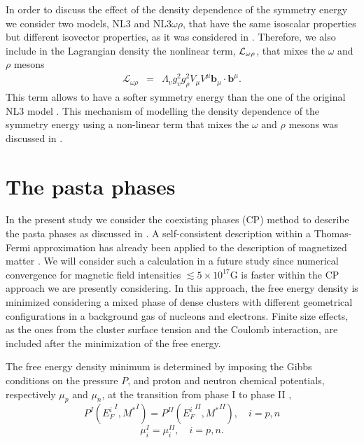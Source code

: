 \documentclass[epj]{svjour}
\begin{document}
In order to discuss the effect of the density dependence of the
symmetry energy we consider two models, NL3 and NL3$\omega\rho$, that have the
same isoscalar properties but different isovector properties, as it was
considered in \cite{Fang16}.
Therefore, we also include in the Lagrangian density the nonlinear term, ${\cal L}_{\omega\rho}$, that mixes the $\omega$ and $\rho$ mesons
\begin{eqnarray}
\mathcal{L}_{\omega \rho } &=& \Lambda_v g_v^2 g_\rho^2 V_{\mu }V^{\mu }
\mathbf{b}_{\mu }\cdot \mathbf{b}^{\mu }.
\end{eqnarray}
This term allows to have a softer symmetry energy than the one of the
original NL3 model  \cite{nl3}. This mechanism of modelling the density dependence of the symmetry energy using a non-linear term that mixes the $\omega$ and $\rho$ mesons was discussed in \cite{Horowitz2001PRL}.

\section{The pasta phases\label{pasta}}


    In the present study we consider the coexisting phases (CP) method to
      describe  the pasta phases as discussed in \cite{Maruyama2005,Avancini-08,Avancini-10,Bao-14,Pais-15}.  A
      self-consistent description within a Thomas-Fermi approximation has
      already been applied to the description of magnetized matter \cite{Lima-13,Bao21}. We will consider such a calculation in a future study since numerical convergence for magnetic
      field intensities $\lesssim 5\times 10^{17}$G is faster within the CP approach we are presently considering.
 In this approach, the free energy density is minimized considering a mixed phase
      of dense clusters with different geometrical configurations in a
      background gas of nucleons and electrons. Finite size effects, as the ones from the cluster
      surface tension and the Coulomb interaction, are included after
      the minimization of the free energy. 
    
 
The free energy density minimum is
determined by imposing the Gibbs conditions on the pressure $P$, and proton
and neutron chemical potentials, respectively $\mu_p$ and $\mu_n$,
 at
the transition from phase I to phase II \cite{Maruyama2005,Avancini-08,Avancini-10,Bao-14,Pais-15},
\begin{equation}
P^I({E^i_{F}}^I,{M^*}^{I})=P^{II}({E^i_{F}}^{II},{M^*}^{II}),
\quad i=p,n\label{gibbs1}
\end{equation}
\begin{equation}
\mu_i^I=\mu_i^{II}, \quad i=p,n . \label{gibbs2}
\end{equation}
\end{document}
